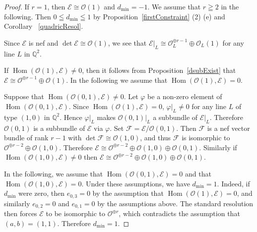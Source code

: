\documentclass[a4paper,12pt]{amsart}
\DeclareMathOperator{\Hom}{Hom}
\begin{document}
\begin{proof}
If $r=1$, then $\mathcal{E}\cong \mathcal{O}(1)$ and $d_{\min}=-1$. 
We assume that $r\geqq 2$ in the following.
Then $0\leqq d_{\min}\leqq 1$
by Proposition~\ref{firstConstraint} (2) (e)
and Corollary ~\ref{quadricResol}.

Since $\mathcal{E}$ is nef and $\det\mathcal{E}\cong\mathcal{O}(1)$,
we see that 
$\mathcal{E}|_L\cong \mathcal{O}_L^{\oplus r-1}\oplus \mathcal{O}_L(1)$
for any line $L$ in $\mathbb{Q}^2$. 

If $\Hom(\mathcal{O}(1),\mathcal{E})\neq 0$,
then it follows from Proposition~\ref{dsubExist} that 
$\mathcal{E}\cong \mathcal{O}^{\oplus r-1}\oplus\mathcal{O}(1)$.
In the following we assume that $\Hom(\mathcal{O}(1),\mathcal{E})= 0$.

Suppose that $\Hom(\mathcal{O}(0,1),\mathcal{E})\neq 0$.
Let $\varphi$ be a non-zero element of $\Hom(\mathcal{O}(0,1), \mathcal{E})$.
Since $\Hom(\mathcal{O}(1),\mathcal{E})= 0$,
$\varphi|_L\neq 0$ for any line $L$ of type $(1,0)$ in $\mathbb{Q}^2$.
Hence $\varphi|_L$ makes $\mathcal{O}(0,1)|_L$ a subbundle of $\mathcal{E}|_L$.
Therefore $\mathcal{O}(0,1)$ is a subbundle of $\mathcal{E}$ via $\varphi$.
Set $\mathcal{F}=\mathcal{E}/\mathcal{O}(0,1)$.
Then $\mathcal{F}$ is a nef vector bundle of rank $r-1$ with $\det\mathcal{F}\cong\mathcal{O}(1,0)$,
and thus $\mathcal{F}$ is isomorphic to $\mathcal{O}^{\oplus r-2}\oplus \mathcal{O}(1,0)$.
Therefore $\mathcal{E}\cong \mathcal{O}^{\oplus r-2}\oplus \mathcal{O}(1,0)\oplus\mathcal{O}(0,1)$.
Similarly if $\Hom(\mathcal{O}(1,0),\mathcal{E})\neq 0$ 
then $\mathcal{E}\cong \mathcal{O}^{\oplus r-2}\oplus \mathcal{O}(1,0)\oplus\mathcal{O}(0,1)$.

In the following, we assume that $\Hom(\mathcal{O}(0,1),\mathcal{E})= 0$ and that $\Hom(\mathcal{O}(1,0),\mathcal{E})= 0$.
Under these assumptions, we have $d_{\min}=1$. Indeed, if $d_{\min}$ were zero,
then $e_{0,3}=0$ by the assumption that $\Hom(\mathcal{O}(1),\mathcal{E})=0$,
and similarly $e_{0,2}=0$ and $e_{0,1}=0$ by the assumptions above.
The standard resolution then forces $\mathcal{E}$ to be isomorphic to $\mathcal{O}^{\oplus r}$,
which contradicts the assumption that $(a,b)=(1,1)$.
Therefore $d_{\min}=1$.


\end{proof}
\end{document}
